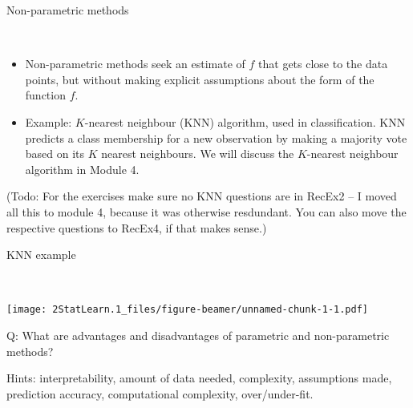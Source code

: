 \documentclass[ignorenonframetext,]{beamer}
\begin{document}
\begin{frame}

\begin{block}{Non-parametric methods}

\(~\)

\begin{itemize}
\item
  Non-parametric methods seek an estimate of \(f\) that gets close to
  the data points, but without making explicit assumptions about the
  form of the function \(f\).
\item
  Example: \(K\)-nearest neighbour (KNN) algorithm, used in
  classification. KNN predicts a class membership for a new observation
  by making a majority vote based on its \(K\) nearest neighbours. We
  will discuss the \(K\)-nearest neighbour algorithm in Module 4.
\end{itemize}

(Todo: For the exercises make sure no KNN questions are in RecEx2 -- I
moved all this to module 4, because it was otherwise resdundant. You can
also move the respective questions to RecEx4, if that makes sense.)

\end{block}

\end{frame}

\begin{frame}

\begin{block}{KNN example}

\(~\)

\texttt{[image: 2StatLearn.1\_files/figure-beamer/unnamed-chunk-1-1.pdf]}

\end{block}

\end{frame}

\begin{frame}

\begin{block}{Q: What are advantages and disadvantages of parametric and
non-parametric methods?}

\vspace{2mm}

Hints: interpretability, amount of data needed, complexity, assumptions
made, prediction accuracy, computational complexity, over/under-fit.

\end{block}

\end{frame}
\end{document}

